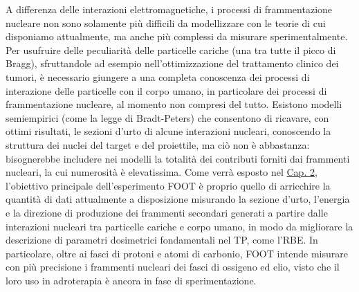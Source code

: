 \documentclass[12pt,a4paper,twoside]{report}
\begin{document}
	A differenza delle interazioni elettromagnetiche, i processi di frammentazione nucleare non sono solamente più difficili da modellizzare con le teorie di cui disponiamo attualmente, ma anche più complessi da misurare sperimentalmente. Per usufruire delle peculiarità delle particelle cariche (una tra tutte il picco di Bragg), sfruttandole ad esempio nell'ottimizzazione del trattamento clinico dei tumori, è necessario giungere a una completa conoscenza dei processi di interazione delle particelle con il corpo umano, in particolare dei processi di frammentazione nucleare, al momento non compresi del tutto. Esistono modelli semiempirici (come la legge di Bradt-Peters) che consentono di ricavare, con ottimi risultati, le sezioni d'urto di alcune interazioni nucleari, conoscendo la struttura dei nuclei del target e del proiettile, ma ciò non è abbastanza: bisognerebbe includere nei modelli la totalità dei contributi forniti dai frammenti nucleari, la cui numerosità è elevatissima. Come verrà esposto nel \hyperref[cap:2]{Cap. 2}, l'obiettivo principale dell'esperimento FOOT è proprio quello di arricchire la quantità di dati attualmente a disposizione misurando la sezione d'urto, l'energia e la direzione di produzione dei frammenti secondari generati a partire dalle interazioni nucleari tra particelle cariche e corpo umano, in modo da migliorare la descrizione di parametri dosimetrici fondamentali nel TP, come l'RBE. In particolare, oltre ai fasci di protoni e atomi di carbonio, FOOT intende misurare con più precisione i frammenti nucleari dei fasci di ossigeno ed elio, visto che il loro uso in adroterapia è ancora in fase di sperimentazione.
	
\end{document}
